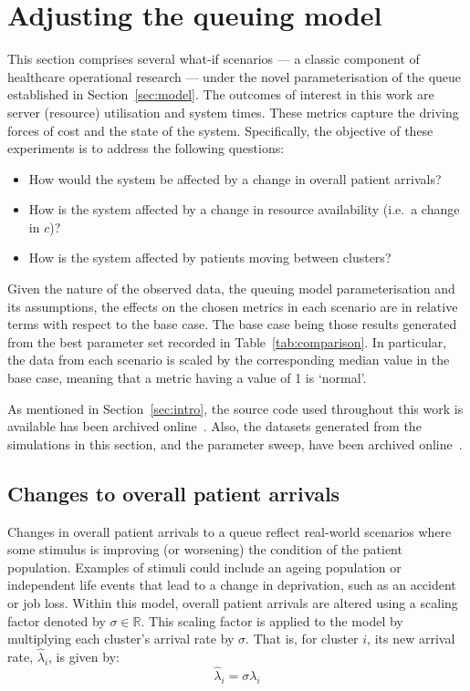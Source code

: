 \documentclass[11pt]{article}
\begin{document}
\section{Adjusting the queuing model}\label{sec:scenarios}

This section comprises several what-if scenarios --- a classic component of
healthcare operational research --- under the novel parameterisation of the
queue established in Section~\ref{sec:model}. The outcomes of interest in this
work are server (resource) utilisation and system times. These metrics capture
the driving forces of cost and the state of the system. Specifically, the
objective of these experiments is to address the following questions:
\begin{itemize}
    \item How would the system be affected by a change in overall patient
        arrivals?
    \item How is the system affected by a change in resource availability (i.e.\
        a change in \(c\))?
    \item How is the system affected by patients moving between clusters?
\end{itemize}

Given the nature of the observed data, the queuing model parameterisation and
its assumptions, the effects on the chosen metrics in each scenario are in
relative terms with respect to the base case. The base case being those results
generated from the best parameter set recorded in Table~\ref{tab:comparison}. In
particular, the data from each scenario is scaled by the corresponding median
value in the base case, meaning that a metric having a value of 1 is ‘normal’.

As mentioned in Section~\ref{sec:intro}, the source code used throughout this
work is available has been archived online~\cite{Wilde2020github}. Also, the
datasets generated from the simulations in this section, and the parameter
sweep, have been archived online~\cite{Wilde2020results}.

\subsection{Changes to overall patient arrivals}\label{subsec:arrivals}

Changes in overall patient arrivals to a queue reflect real-world scenarios
where some stimulus is improving (or worsening) the condition of the patient
population. Examples of stimuli could include an ageing population or
independent life events that lead to a change in deprivation, such as an
accident or job loss. Within this model, overall patient arrivals are altered
using a scaling factor denoted by \(\sigma\in\mathbb{R}\). This scaling factor
is applied to the model by multiplying each cluster's arrival rate by
\(\sigma\). That is, for cluster \(i\), its new arrival rate, \(\hat\lambda_i\),
is given by:
\begin{equation}\label{eq:lambda}
    \hat\lambda_{i} = \sigma\lambda_i
\end{equation}
\end{document}
